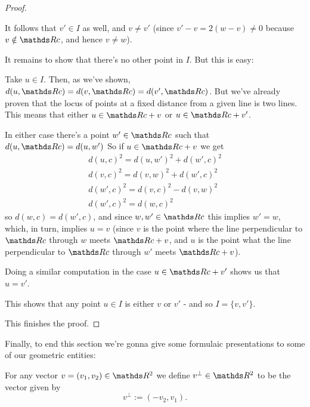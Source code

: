 \begin{proof}
\begin{itemize}
	It follows that $v'\in I$ as well, and $v\neq v'$ (since $v'-v=2(w-v)\neq0$ because $v\notin \R c$, and hence $v\neq w$).
	
	It remains to show that there's no other point in $I$. But this is easy:
	
	Take $u\in I$. Then, as we've shown, $d(u,\R c)=d(v,\R c)=d(v',\R c)$. But we've already proven that the locus of points at a fixed distance from a given line is two lines. This means that either $u\in \R c +v$ or $u\in \R  c+v'$.
	
	In either case there's a point $w'\in \R c$ such that $d(u,\R c )=d(u,w')$ So if $u\in \R c+v$ we get
	\begin{gather*}
		d(u,c)^2=d(u,w')^2+d(w',c)^2\\
		d(v,c)^2=d(v,w)^2+d(w',c)^2\\
		d(w',c)^2=d(v,c)^2-d(v,w)^2\\
		d(w',c)^2=d(w,c)^2
	\end{gather*}so $d(w,c)=d(w',c)$, and since $w,w'\in \R c$ this implies $w'=w$, which, in turn, implies $u=v$ (since $v$ is the point where the line perpendicular to $\R c$ through $w$ meets $\R c+v$, and $u$ is the point what the line perpendicular to $\R c$ through $w'$ meets $\R c+v$).
	
	Doing a similar computation in the case $u\in \R c +v'$ shows us that $u=v'$.
	
	This shows that any point $u\in I$ is either $v$ or $v'$ - and so $I=\{v,v'\}$.
	\end{itemize}

This finishes the proof.
\end{proof}

Finally, to end this section we're gonna give some formulaic presentations to some of our geometric entities:

\begin{df}
	For any vector $v=(v_1,v_2)\in \R^2$ we define $v^\perp\in\R^2$ to be the vector given by
	\[v^\perp:=(-v_2,v_1).\]
\end{df}

